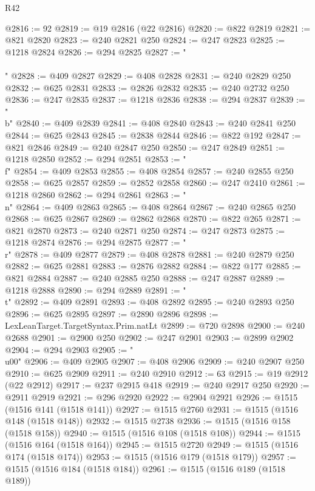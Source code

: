\begin{lexlean}{R42}
\begin{coremodule}
{@2816 := 92
@2819 := @19 @2816 (@22 @2816)
@2820 := @822 @2819
@2821 := @821 @2820
@2823 := @240 @2821 @250
@2824 := @247 @2823
@2825 := @1218 @2824
@2826 := @294 @2825
@2827 := "\\\\"
@2828 := @409 @2827
@2829 := @408 @2828
@2831 := @240 @2829 @250
@2832 := @625 @2831
@2833 := @2826 @2832
@2835 := @240 @2732 @250
@2836 := @247 @2835
@2837 := @1218 @2836
@2838 := @294 @2837
@2839 := "\\b"
@2840 := @409 @2839
@2841 := @408 @2840
@2843 := @240 @2841 @250
@2844 := @625 @2843
@2845 := @2838 @2844
@2846 := @822 @192
@2847 := @821 @2846
@2849 := @240 @2847 @250
@2850 := @247 @2849
@2851 := @1218 @2850
@2852 := @294 @2851
@2853 := "\\f"
@2854 := @409 @2853
@2855 := @408 @2854
@2857 := @240 @2855 @250
@2858 := @625 @2857
@2859 := @2852 @2858
@2860 := @247 @2410
@2861 := @1218 @2860
@2862 := @294 @2861
@2863 := "\\n"
@2864 := @409 @2863
@2865 := @408 @2864
@2867 := @240 @2865 @250
@2868 := @625 @2867
@2869 := @2862 @2868
@2870 := @822 @265
@2871 := @821 @2870
@2873 := @240 @2871 @250
@2874 := @247 @2873
@2875 := @1218 @2874
@2876 := @294 @2875
@2877 := "\\r"
@2878 := @409 @2877
@2879 := @408 @2878
@2881 := @240 @2879 @250
@2882 := @625 @2881
@2883 := @2876 @2882
@2884 := @822 @177
@2885 := @821 @2884
@2887 := @240 @2885 @250
@2888 := @247 @2887
@2889 := @1218 @2888
@2890 := @294 @2889
@2891 := "\\t"
@2892 := @409 @2891
@2893 := @408 @2892
@2895 := @240 @2893 @250
@2896 := @625 @2895
@2897 := @2890 @2896
@2898 := LexLeanTarget.TargetSyntax.Prim.natLt
@2899 := @720 @2898
@2900 := @240 @2688
@2901 := @2900 @250
@2902 := @247 @2901
@2903 := @2899 @2902
@2904 := @294 @2903
@2905 := "\\u00"
@2906 := @409 @2905
@2907 := @408 @2906
@2909 := @240 @2907 @250
@2910 := @625 @2909
@2911 := @240 @2910
@2912 := 63
@2915 := @19 @2912 (@22 @2912)
@2917 := @237 @2915 @418
@2919 := @240 @2917 @250
@2920 := @2911 @2919
@2921 := @296 @2920
@2922 := @2904 @2921
@2926 := @1515 (@1516 @141 (@1518 @141))
@2927 := @1515 @2760
@2931 := @1515 (@1516 @148 (@1518 @148))
@2932 := @1515 @2738
@2936 := @1515 (@1516 @158 (@1518 @158))
@2940 := @1515 (@1516 @108 (@1518 @108))
@2944 := @1515 (@1516 @164 (@1518 @164))
@2945 := @1515 @2720
@2949 := @1515 (@1516 @174 (@1518 @174))
@2953 := @1515 (@1516 @179 (@1518 @179))
@2957 := @1515 (@1516 @184 (@1518 @184))
@2961 := @1515 (@1516 @189 (@1518 @189))
}
\end{coremodule}
\end{lexlean}
